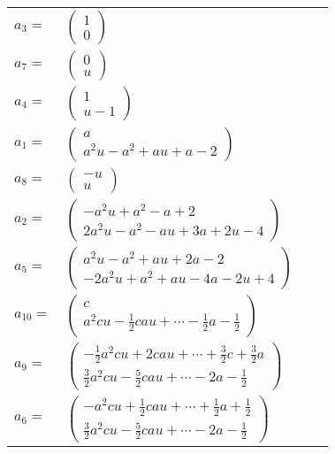 \documentclass[1p]{elsarticle_modified}
\theoremstyle{definition}
\begin{document}
\begin{tabular}{m{7pt} m{180pt} m{7pt} m{180pt} }
\flushright $a_{3}=$&$\begin{pmatrix}1\\0\end{pmatrix}$ \\
\flushright $a_{7}=$&$\begin{pmatrix}0\\u\end{pmatrix}$ \\
\flushright $a_{4}=$&$\begin{pmatrix}1\\u-1\end{pmatrix}$ \\
\flushright $a_{1}=$&$\begin{pmatrix}a\\a^2 u- a^2+a u+a-2\end{pmatrix}$ \\
\flushright $a_{8}=$&$\begin{pmatrix}- u\\u\end{pmatrix}$ \\
\flushright $a_{2}=$&$\begin{pmatrix}- a^2 u+a^2- a+2\\2 a^2 u- a^2- a u+3 a+2 u-4\end{pmatrix}$ \\
\flushright $a_{5}=$&$\begin{pmatrix}a^2 u- a^2+a u+2 a-2\\-2 a^2 u+a^2+a u-4 a-2 u+4\end{pmatrix}$ \\
\flushright $a_{10}=$&$\begin{pmatrix}c\\a^2 c u-\frac{1}{2} c a u+\cdots-\frac{1}{2} a-\frac{1}{2}\end{pmatrix}$ \\
\flushright $a_{9}=$&$\begin{pmatrix}-\frac{1}{2} a^2 c u+2 c a u+\cdots+\frac{3}{2} c+\frac{3}{2} a\\\frac{3}{2} a^2 c u-\frac{5}{2} c a u+\cdots-2 a-\frac{1}{2}\end{pmatrix}$ \\
\flushright $a_{6}=$&$\begin{pmatrix}- a^2 c u+\frac{1}{2} c a u+\cdots+\frac{1}{2} a+\frac{1}{2}\\\frac{3}{2} a^2 c u-\frac{5}{2} c a u+\cdots-2 a-\frac{1}{2}\end{pmatrix}$ \\

\end{tabular}
\end{document}
